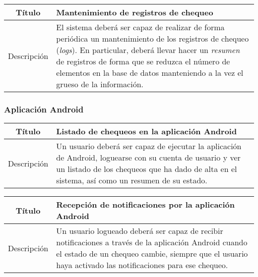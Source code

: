\begin{center}
  
  \begin{tabularx}{\textwidth}{|c|X|}
    \hline
    Título & Mantenimiento de registros de chequeo \\

    \hline

    Descripción & El sistema deberá ser capaz de realizar de forma periódica un
    mantenimiento de los registros de chequeo (\textit{logs}). En particular,
    deberá llevar hacer un \textit{resumen} de registros de forma que se reduzca
    el número de elementos en la base de datos manteniendo a la vez el grueso de
    la información. \\

    \hline
  \end{tabularx}
\end{center}




\FloatBarrier
\subsubsection{Aplicación Android}


\begin{center}
  
  \begin{tabularx}{\textwidth}{|c|X|}
    \hline
    Título & Listado de chequeos en la aplicación Android \\

    \hline

    Descripción & Un usuario deberá ser capaz de ejecutar la aplicación de
    Android, loguearse con su cuenta de usuario y ver un listado de los chequeos
    que ha dado de alta en el sistema, así como un resumen de su estado.
    \\

    \hline
  \end{tabularx}
\end{center}


\begin{center}
  
  \begin{tabularx}{\textwidth}{|c|X|}
    \hline
    Título & Recepción de notificaciones por la aplicación Android \\

    \hline

    Descripción & Un usuario logueado deberá ser capaz de recibir notificaciones
    a través de la aplicación Android cuando el estado de un chequeo cambie,
    siempre que el usuario haya activado las notificaciones para ese
    chequeo. \\

    \hline
  \end{tabularx}
\end{center}


